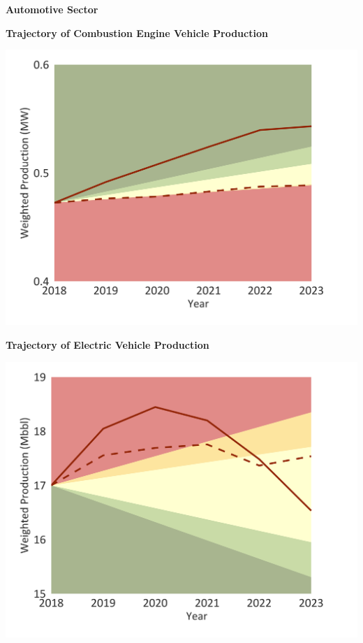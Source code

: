 \documentclass[10pt,table,a4]{article}\usepackage[]{graphicx}\usepackage[]{color}
\begin{document}
	
	\begin{center}
		\textbf{Automotive Sector}
	\end{center}
	
	\begin{minipage}[t]{.49\linewidth}
		\textbf{Trajectory of Combustion Engine Vehicle Production}
		
		\includegraphics[trim = {0 0cm 0 0},width=1\linewidth]{CAFigures/Fig20}
		
	\end{minipage}	
	\hspace{.02\linewidth}
	\begin{minipage}[t]{.49\textwidth}
		\textbf{Trajectory of Electric Vehicle Production}
		
		\includegraphics[trim = {0 0cm 0 0},width=1\linewidth]{CAFigures/Fig21}
		
	\end{minipage}		
	
\end{document}
